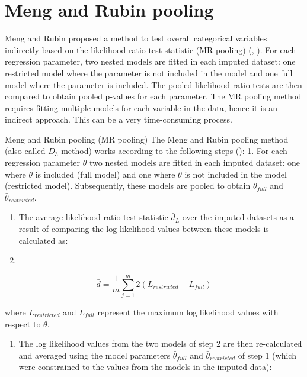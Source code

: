 \documentclass[]{book}
\providecommand{\tightlist}{%
  \setlength{\itemsep}{0pt}\setlength{\parskip}{0pt}}
\begin{document}
\section{Meng and Rubin pooling}\label{meng-and-rubin-pooling}

Meng and Rubin proposed a method to test overall categorical variables
indirectly based on the likelihood ratio test statistic (MR pooling)
(\citet{Meng1992}, \citet{Mistler2013}). For each regression parameter,
two nested models are fitted in each imputed dataset: one restricted
model where the parameter is not included in the model and one full
model where the parameter is included. The pooled likelihood ratio tests
are then compared to obtain pooled p-values for each parameter. The MR
pooling method requires fitting multiple models for each variable in the
data, hence it is an indirect approach. This can be a very
time-consuming process.

Meng and Rubin pooling (MR pooling) The Meng and Rubin pooling method
(also called \(D_3\) method) works according to the following steps
(\citet{Meng1992}): 1. For each regression parameter \(\theta\) two
nested models are fitted in each imputed dataset: one where \(\theta\)
is included (full model) and one where \(\theta\) is not included in the
model (restricted model). Subsequently, these models are pooled to
obtain \(\bar\theta_{full}\) and \(\bar\theta_{restricted}\).

\begin{enumerate}
\def\labelenumi{\arabic{enumi}.}
\setcounter{enumi}{1}
\item
  The average likelihood ratio test statistic \(\bar d_L\) over the
  imputed datasets as a result of comparing the log likelihood values
  between these models is calculated as:
\item
\end{enumerate}

\[\bar d = \frac{1}{m} \sum_{j=1}^m 2(L_{restricted} - L_{full})\]

where \(L_{restricted}\) and \(L_{full}\) represent the maximum log
likelihood values with respect to \(\theta\).

\begin{enumerate}
\def\labelenumi{\arabic{enumi}.}
\setcounter{enumi}{3}
\tightlist
\item
  The log likelihood values from the two models of step 2 are then
  re-calculated and averaged using the model parameters
  \(\bar\theta_{full}\) and \(\bar\theta_{restricted}\) of step 1 (which
  were constrained to the values from the models in the imputed data):
\end{enumerate}
\end{document}
